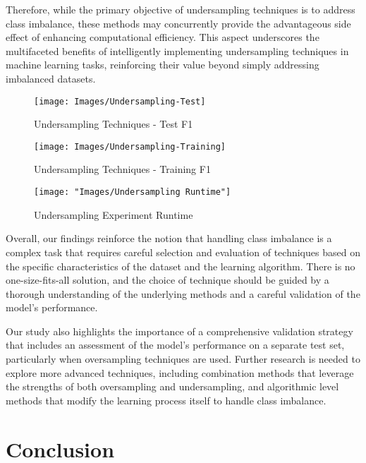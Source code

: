\documentclass[journal]{IEEEtran}
\begin{document}
	Therefore, while the primary objective of undersampling techniques is to address class imbalance, these methods may concurrently provide the advantageous side effect of enhancing computational efficiency. This aspect underscores the multifaceted benefits of intelligently implementing undersampling techniques in machine learning tasks, reinforcing their value beyond simply addressing imbalanced datasets.	

\begin{figure}
	\centering
	\texttt{[image: Images/Undersampling-Test]}
	\caption{Undersampling Techniques - Test F1}
	\label{fig:undersampling-test}
\end{figure}
	
\begin{figure}
	\centering
	\texttt{[image: Images/Undersampling-Training]}
	\caption{Undersampling Techniques - Training F1}
	\label{fig:undersampling-training}
\end{figure}

\begin{figure}
	\centering
	\texttt{[image: "Images/Undersampling Runtime"]}
	\caption{Undersampling Experiment Runtime}
	\label{fig:undersampling-runtime}
\end{figure}
	
	Overall, our findings reinforce the notion that handling class imbalance is a complex task that requires careful selection and evaluation of techniques based on the specific characteristics of the dataset and the learning algorithm. There is no one-size-fits-all solution, and the choice of technique should be guided by a thorough understanding of the underlying methods and a careful validation of the model's performance.
	
	Our study also highlights the importance of a comprehensive validation strategy that includes an assessment of the model's performance on a separate test set, particularly when oversampling techniques are used. Further research is needed to explore more advanced techniques, including combination methods that leverage the strengths of both oversampling and undersampling, and algorithmic level methods that modify the learning process itself to handle class imbalance.
	
	
	\section{Conclusion}
	\label{sec:conclusion}
	
\end{document}
